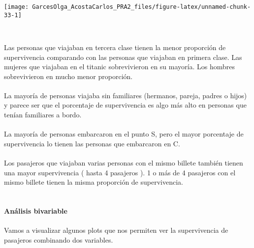 \documentclass[
]{article}
\begin{document}
\begin{center}\texttt{[image: GarcesOlga\_AcostaCarlos\_PRA2\_files/figure-latex/unnamed-chunk-33-1]} \end{center}

\texttt{}\\
\texttt{}

Las personas que viajaban en tercera clase tienen la menor proporción de
supervivencia comparando con las personas que viajaban en primera clase.
Las mujeres que viajaban en el titanic sobrevivieron en su mayoría. Los
hombres sobrevivieron en mucho menor proporción.\\
\texttt{}~\\
La mayoría de personas viajaba sin familiares (hermanos, pareja, padres
o hijos) y parece ser que el porcentaje de supervivencia es algo más
alto en personas que tenían familiares a bordo.\\
\texttt{}~\\
La mayoría de personas embarcaron en el punto S, pero el mayor
porcentaje de supervivencia lo tienen las personas que embarcaron en
C.\\
\texttt{}~\\
Los pasajeros que viajaban varias personas con el mismo billete también
tienen una mayor supervivencia ( hasta 4 pasajeros ). 1 o más de 4
pasajeros con el mismo billete tienen la misma proporción de
supervivencia.\\
\texttt{}~\\
\texttt{}~\\
\textbf{Análisis bivariable}\\
\texttt{}~\\
Vamos a visualizar algunos plots que nos permiten ver la supervivencia
de pasajeros combinando dos variables.\\
\texttt{}
\end{document}
